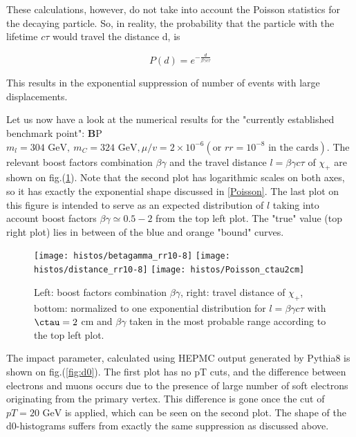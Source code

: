 \documentclass[12pt,letterpaper,notitlepage]{article}
\begin{document}
These calculations, however, do not take into account the Poisson statistics for the decaying particle. So, in reality, the probability that the particle with the lifetime $c \tau$ would travel the distance d, is

\begin{equation} \label{Poisson}
  P(d)=e^{-\frac{d}{\beta \gamma c \tau}}
\end{equation}

This results in the exponential suppression of number of events with large displacements.

Let us now have a look at the numerical results for the "currently established benchmark point":
{\textbf BP } $m_l = 304 \text{ GeV},\ m_C = 324\text{ GeV}, \mu/v=2 \times 10^{-6} (\text{or } rr=10^{-8} \text{ in the cards})$.
 The relevant boost factors combination $\beta \gamma$ and the travel distance $l =\beta \gamma c \tau$ of $\chi_+$ are shown on fig.(\ref{fig:boost-distance}). Note that the second plot has logarithmic scales on both axes, so it has exactly the exponential shape discussed in \ref{Poisson}. The last plot on this figure is intended to serve as an expected distribution of $l$ taking into account boost factors $\beta \gamma \simeq 0.5-2$ from the top left plot. The "true" value (top right plot) lies in between of the blue and orange "bound" curves.

\begin{figure}[h!]
\centering
\texttt{[image: histos/betagamma\_rr10-8]}
\texttt{[image: histos/distance\_rr10-8]}
\texttt{[image: histos/Poisson\_ctau2cm]}


\caption{\label{fig:boost-distance} Left: boost factors combination $\beta \gamma$, right: travel distance of $\chi_+$, bottom: normalized to one exponential distribution for $l=\beta \gamma c\tau$ with $\ctau=2$ cm and $\beta \gamma$ taken in the most probable range according to the top left plot.}
\end{figure}

The impact parameter, calculated using HEPMC output generated by Pythia8 is shown on fig.(\ref{fig:d0}). The first plot has no pT cuts, and the difference between electrons and muons occurs due to the presence of large number of soft electrons originating from the primary vertex. This difference is gone once the cut of $pT=20 \text{ GeV}$ is applied, which can be seen on the second plot. The shape of the d0-histograms suffers from exactly the same suppression as discussed above.
\end{document}
